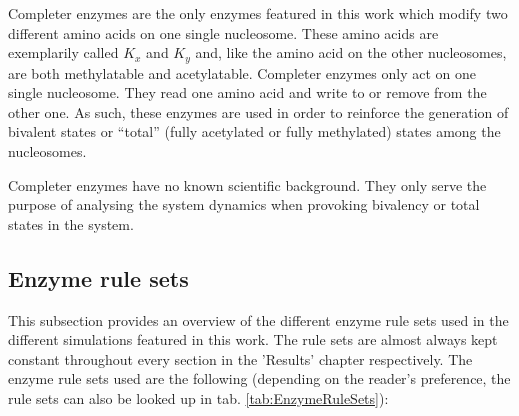                 Completer enzymes are the only enzymes featured in this work which modify two different amino acids on one single nucleosome. These amino acids are exemplarily called $K_x$ and $K_y$ and, like the amino acid on the other nucleosomes, are both methylatable and acetylatable. Completer enzymes only act on one single nucleosome. They read one amino acid and write to or remove from the other one. As such, these enzymes are used in order to reinforce the generation of bivalent states or “total” (fully acetylated or fully methylated) states among the nucleosomes.

                Completer enzymes have no known scientific background. They only serve the purpose of analysing the system dynamics when provoking bivalency or total states in the system.
        \subsection{Enzyme rule sets}
            This subsection provides an overview of the different enzyme rule sets used in the different simulations featured in this work. The rule sets are almost always kept constant throughout every section in the 'Results' chapter respectively. The enzyme rule sets used are the following (depending on the reader's preference, the rule sets can also be looked up in tab. \ref{tab:EnzymeRuleSets}):


